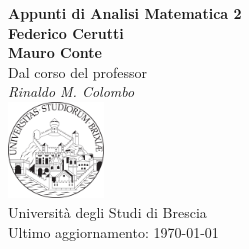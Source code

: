 \documentclass[a4paper,twoside,italian]{book}
\begin{document}
\pagestyle{headings}

\frontmatter
\begin{titlepage}
  \begin{center}
    {\huge\bfseries Appunti di Analisi Matematica 2\\}
    \vspace{1.5cm}
    {\Large\bfseries Federico Cerutti\\Mauro Conte\\}
    \vspace{2cm}
    {Dal corso del professor}\\[5pt]
    \emph{{Rinaldo M. Colombo}}\\[2cm]
    \vfill
    \includegraphics[width=0.19\textwidth]{unibs-logo.png}\\[5pt]
    {Università degli Studi di Brescia}\\[10pt]
    {Ultimo aggiornamento: \today}
  \end{center}
\end{titlepage}

\null\vfill
\doclicenseThis
\newpage

\tableofcontents


\mainmatter








\backmatter
\end{document}
